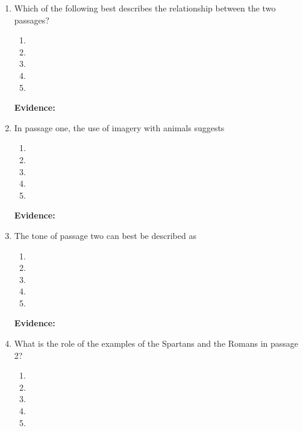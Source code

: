\bigskip
\begin{enumerate}

\item Which of the following best describes the relationship between the two passages?

\bigskip
\begin{enumerate}[label=(\Alph*)]
\item 
\item
\item 
\item 
\item 
\end{enumerate}

\bigskip
\textbf{Evidence:} \hrulefill

\bigskip
\item In passage one, the use of imagery with animals suggests

\bigskip
\begin{enumerate}[label=(\Alph*)]
\item 
\item
\item 
\item 
\item 
\end{enumerate}

\bigskip
\textbf{Evidence:} \hrulefill

\bigskip
\item The tone of passage two can best be described as

\bigskip
\begin{enumerate}[label=(\Alph*)]
\item 
\item
\item 
\item 
\item 
\end{enumerate}

\bigskip
\textbf{Evidence:} \hrulefill


\bigskip
\item What is the role of the examples of the Spartans and the Romans in passage 2?

\bigskip
\begin{enumerate}[label=(\Alph*)]
\item 
\item
\item 
\item 
\item 
\end{enumerate}


\end{enumerate}
